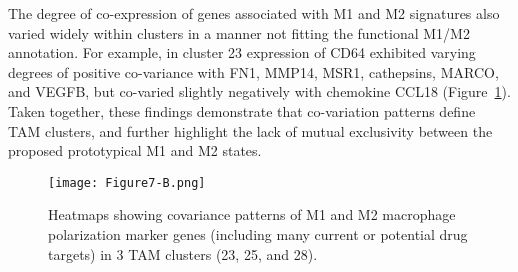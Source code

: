 The degree of co-expression of genes associated with M1 and M2 signatures also varied widely within clusters in a manner not fitting the functional M1/M2 annotation.
For example, in cluster 23 expression of CD64 exhibited varying degrees of positive co-variance with FN1, MMP14, MSR1, cathepsins, MARCO, and VEGFB, but co-varied slightly negatively with chemokine CCL18 (Figure~\ref{fig:7b}).
Taken together, these findings demonstrate that co-variation patterns define TAM clusters, and further highlight the lack of mutual exclusivity between the proposed prototypical M1 and M2 states.

\begin{figure}
\centering
\texttt{[image: Figure7-B.png]}
\caption{Heatmaps showing covariance patterns of M1 and M2 macrophage polarization marker genes (including many current or potential drug targets) in 3 TAM clusters (23, 25, and 28).
}
\label{fig:7b}
\end{figure}

